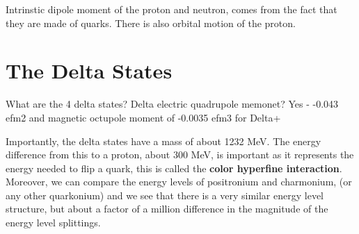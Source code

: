 Intrinstic dipole moment of the proton and neutron, comes from the fact that they are made of quarks. There is also orbital motion of the proton.

            
    \section{The Delta States}
            What are the 4 delta states?
            Delta electric quadrupole memonet? Yes - -0.043 efm2 and magnetic octupole moment of -0.0035 efm3 for Delta+
            
            Importantly, the delta states have a mass of about 1232 MeV. The energy difference from this to a proton, about 300 MeV, is important as it represents the energy needed to flip a quark, this is called the \textbf{color hyperfine interaction}. Moreover, we can compare the energy levels of positronium and charmonium, (or any other quarkonium) and we see that there is a very similar energy level structure, but about a factor of a million difference in the magnitude of the energy level splittings. 

